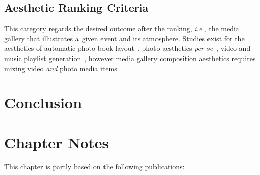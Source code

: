 \subsection{Aesthetic Ranking Criteria}
This category regards the desired outcome after the ranking, \emph{i.e.},
the media gallery that illustrates a~given event and its atmosphere.
Studies exist for the aesthetics of
automatic photo book layout~\cite{Photo2011},
photo aesthetics \emph{per se}~\cite{Photo2012},
video and music playlist generation~\cite{YouTube2010,Playlist2006},
however media gallery composition aesthetics requires mixing video
\emph{and} photo media items.

\section{Conclusion}

\section*{Chapter Notes}
This chapter is partly based on the following publications:
